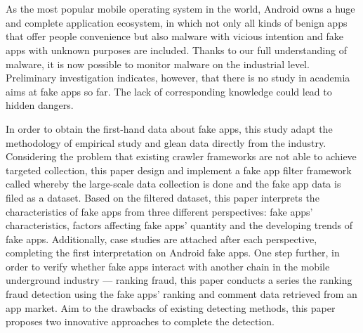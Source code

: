 \newpage
\cleardoublepage{}

\chapter*{}
\vspace{-5mm}

As the most popular mobile operating system in the world, Android owns a huge and complete application ecosystem, in which not only all kinds of benign apps that offer people convenience but also malware with vicious intention and fake apps with unknown purposes are included.
Thanks to our full understanding of malware, it is now possible to monitor malware on the industrial level.
Preliminary investigation indicates, however, that there is no study in academia aims at fake apps so far.
The lack of corresponding knowledge could lead to hidden dangers.

In order to obtain the first-hand data about fake apps, this study adapt the methodology of empirical study and glean data directly from the industry.
Considering the problem that existing crawler frameworks are not able to achieve targeted collection, this paper design and implement a fake app filter framework called \mytool whereby the large-scale data collection is done and the fake app data is filed as a dataset.
Based on the filtered dataset, this paper interprets the characteristics of fake apps from three different perspectives: fake apps' characteristics, factors affecting fake apps' quantity and the developing trends of fake apps.
Additionally, case studies are attached after each perspective, completing the first interpretation on Android fake apps.
One step further, in order to verify whether fake apps interact with another chain in the mobile underground industry --- ranking fraud, this paper conducts a series the ranking fraud detection using the fake apps' ranking and comment data retrieved from an app market.
Aim to the drawbacks of existing detecting methods, this paper proposes two innovative approaches to complete the detection.


